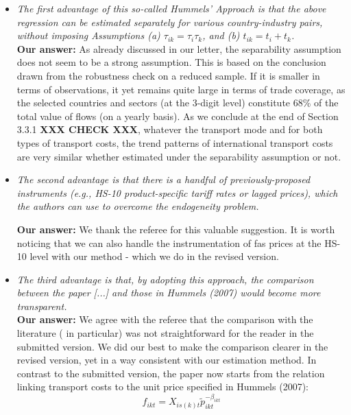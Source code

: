 \documentclass[a4paper,11pt]{article}
\begin{document}
\begin{itemize}
\item \textit{The first advantage of this so-called Hummels' Approach is that the above
regression can be estimated separately for various country-industry pairs, without
imposing Assumptions (a) $\tau_{ik} = \tau_i\tau_{k}$, and (b) $t_{ik} = t_i+ t_{k}$.} \\

\textbf{Our answer:}
As already discussed in our letter, the separability assumption does not seem to be a strong assumption. This is based on the conclusion drawn from the robustness check on a reduced sample. If it is smaller in terms of observations, it yet remains quite large in terms of trade coverage, as the selected countries and sectors (at the 3-digit level) constitute 68\% of the total value of flows (on a yearly basis). As we conclude at the end of Section 3.3.1 \textbf{XXX CHECK XXX}, whatever the transport mode and for both types of transport costs, the trend patterns of international transport costs are very similar whether estimated under the separability assumption or not.

\item \textit{The second advantage is that there is a handful of previously-proposed instruments (e.g., HS-10 product-specific tariff rates or lagged prices), which the authors can use to overcome the endogeneity problem.}

     \textbf{Our answer:}
We thank the referee for this valuable suggestion. It is worth noticing that we can also handle the instrumentation of fas prices at the HS-10 level with our method - which we do in the revised version.


\item  \textit{The third advantage is that, by adopting this approach, the comparison between the paper [...] and those in Hummels (2007) would become more transparent.}\\
     \textbf{Our answer:}
     We agree with the referee that the comparison with the literature (\citealp{hummels2007} in particular) was not straightforward for the reader in the submitted version. We did our best to make the comparison clearer in the revised version, yet in a way consistent with our estimation method. In contrast to the submitted version, the paper now starts from the relation linking transport costs to the unit price specified in Hummels (2007):
    \begin{equation}
    f_{ikt} = X_{is(k)t}\widetilde{p}_{ikt}^{-\beta_{ikt}} \label{eq:Hummels}
    \end{equation}


\end{itemize}
\end{document}
